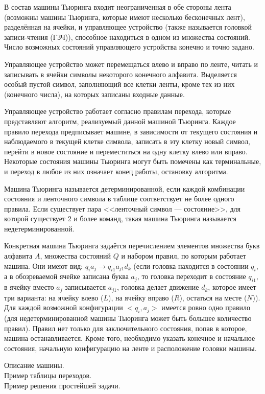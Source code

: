 \documentclass[12pt, twoside]{report}
\begin{document}
В состав машины Тьюринга входит неограниченная в обе стороны лента (возможны машины Тьюринга, которые имеют несколько бесконечных лент), разделённая на ячейки, и управляющее устройство (также называется головкой записи-чтения (ГЗЧ)), способное находиться в одном из множества состояний. Число возможных состояний управляющего устройства конечно и точно задано.

Управляющее устройство может перемещаться влево и вправо по ленте, читать и записывать в ячейки символы некоторого конечного алфавита. Выделяется особый пустой символ, заполняющий все клетки ленты, кроме тех из них (конечного числа), на которых записаны входные данные.

Управляющее устройство работает согласно правилам перехода, которые представляют алгоритм, реализуемый данной машиной Тьюринга. Каждое правило перехода предписывает машине, в зависимости от текущего состояния и наблюдаемого в текущей клетке символа, записать в эту клетку новый символ, перейти в новое состояние и переместиться на одну клетку влево или вправо. Некоторые состояния машины Тьюринга могут быть помечены как терминальные, и переход в любое из них означает конец работы, остановку алгоритма.

Машина Тьюринга называется детерминированной, если каждой комбинации состояния и ленточного символа в таблице соответствует не более одного правила. Если существует пара <<ленточный символ — состояние>>, для которой существует 2 и более команд, такая машина Тьюринга называется недетерминированной.

Конкретная машина Тьюринга задаётся перечислением элементов множества букв алфавита $A$, множества состояний $Q$ и набором правил, по которым работает машина. Они имеют вид: $q_ia_j \rightarrow q_{i1}a_{j1}d_k$ (если головка находится в состоянии $q_i$, а в обозреваемой ячейке записана буква $a_j$, то головка переходит в состояние $q_{i1}$, в ячейку вместо $a_j$ записывается $a_{j1}$, головка делает движение $d_k$, которое имеет три варианта: на ячейку влево ($L$), на ячейку вправо ($R$), остаться на месте ($N$)). Для каждой возможной конфигурации $<q_i, a_j>$ имеется ровно одно правило (для недетерминированной машины Тьюринга может быть большее количество правил). Правил нет только для заключительного состояния, попав в которое, машина останавливается. Кроме того, необходимо указать конечное и начальное состояния, начальную конфигурацию на ленте и расположение головки машины.

Описание машины. \\
Пример таблицы переходов.\\
Пример решения простейшей задачи.
\end{document}
